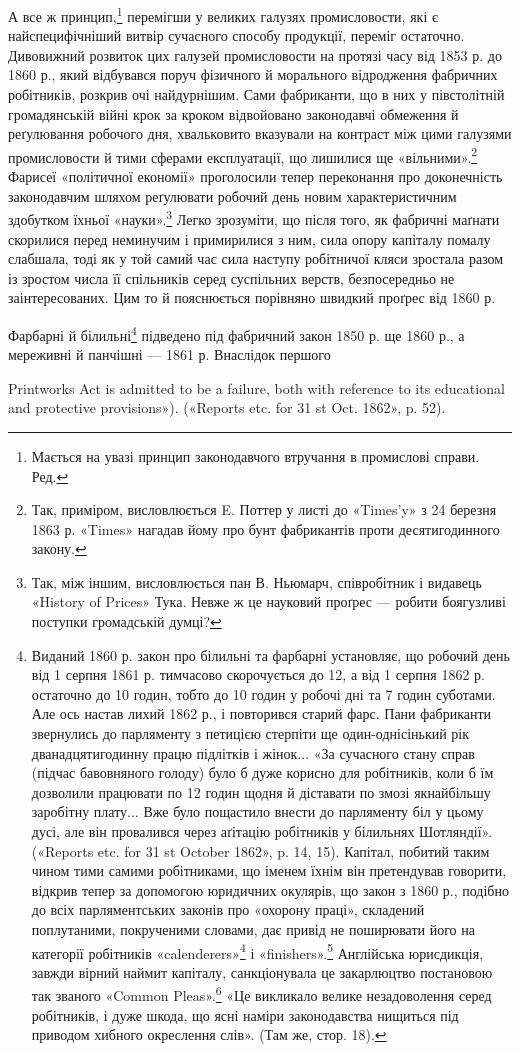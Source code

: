 А все ж принцип,\footnote*{
Мається на увазі принцип законодавчого втручання в промислові
справи. Ред.
} перемігши у великих галузях промисловости,
які є найспецифічніший витвір сучасного способу продукції,
переміг остаточно. Дивовижний розвиток цих галузей промисловости
на протязі часу від 1853 р. до 1860 р., який відбувався
поруч фізичного й морального відродження фабричних робітників,
розкрив очі найдурнішим. Сами фабриканти, що в них у
півстолітній громадянській війні крок за кроком відвойовано
законодавчі обмеження й реґулювання робочого дня, хвальковито
вказували на контраст між цими галузями промисловости
й тими сферами експлуатації, що лишилися ще «вільними».\footnote{
Так, приміром, висловлюється E. Поттер у листі до «Times’y»
з 24 березня 1863 р. «Times» нагадав йому про бунт фабрикантів проти
десятигодинного закону.
}
Фарисеї «політичної економії» проголосили тепер переконання
про доконечність законодавчим шляхом реґулювати робочий день
новим характеристичним здобутком їхньої «науки».\footnote{
Так, між іншим, висловлюється пан В. Ньюмарч, співробітник
і видавець «History of Prices» Тука. Невже ж це науковий проґрес —
робити боягузливі поступки громадській думці?
} Легко
зрозуміти, що після того, як фабричні маґнати скорилися перед
неминучим і примирилися з ним, сила опору капіталу помалу
слабшала, тоді як у той самий час сила наступу робітничої кляси
зростала разом із зростом числа її спільників серед суспільних
верств, безпосередньо не заінтересованих. Цим то й пояснюється
порівняно швидкий проґрес від 1860 р.

Фарбарні й білильні\footnote{
Виданий 1860 р. закон про білильні та фарбарні установляє,
що робочий день від 1 серпня 1861 р. тимчасово скорочується до 12, а
від 1 серпня 1862 р. остаточно до 10 годин, тобто до 10 годин у робочі
дні та 7 годин суботами. Але ось настав лихий 1862 р., і повторився
старий фарс. Пани фабриканти звернулись до парляменту з петицією
стерпіти ще один-однісінький рік дванадцятигодинну працю підлітків
і жінок... «За сучасного стану справ (підчас бавовняного голоду) було б
дуже корисно для робітників, коли б їм дозволили працювати по 12 годин
щодня й діставати по змозі якнайбільшу заробітну плату... Вже було
пощастило внести до парляменту біл у цьому дусі, але він провалився
через аґітацію робітників у білильнях Шотляндії». («Reports etc. for
31 st October 1862», p. 14, 15). Капітал, побитий таким чином тими самими
робітниками, що іменем їхнім він претендував говорити, відкрив тепер
за допомогою юридичних окулярів, що закон з 1860 р., подібно до всіх
парляментських законів про «охорону праці», складений поплутаними,
покрученими словами, дає привід не поширювати його на категорії робітників
«calenderers»\footnote*{
— пресувальники сукна. Ред.
} і «finishers».\footnote*{
— апретери. Ред.
} Англійська юрисдикція, завжди
вірний наймит капіталу, санкціонувала це закарлюцтво постановою так
званого «Common Pleas».\footnote*{
— цивільний суд. Ред.
} «Це викликало велике незадоволення серед
робітників, і дуже шкода, що ясні наміри законодавства нищиться під
приводом хибного окреслення слів». (Там же, стор. 18).
} підведено під фабричний закон 1850 р.
ще 1860 р., а мереживні й панчішні — 1861 р. Внаслідок першого

Printworks Act is admitted to be a failure, both with reference to its educational
and protective provisions»). («Reports etc. for 31 st Oct. 1862», p. 52).
